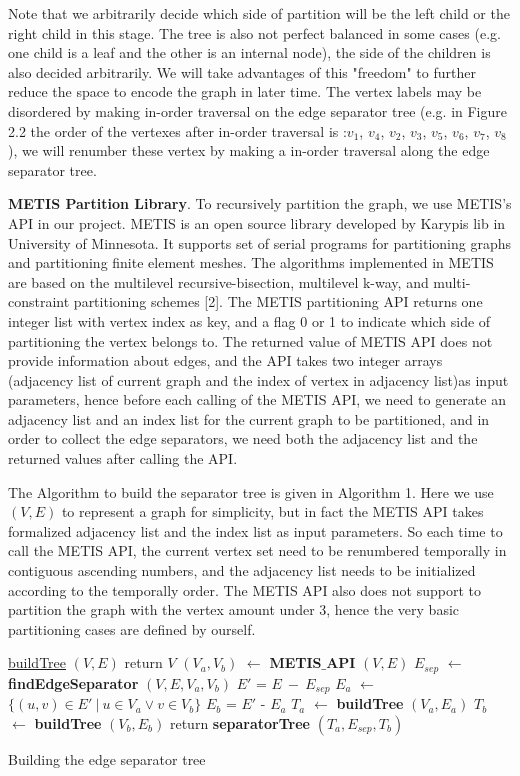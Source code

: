 \documentclass[12pt,glossary]{dalthesis}
\begin{document}
Note that we arbitrarily decide which side of partition will be the left child or the right child in this stage. The tree is also not perfect balanced in some cases (e.g. one child is a leaf and the other is an internal node), the side of the children is also decided arbitrarily. We will take advantages of this "freedom" to further reduce the space to encode the graph in later time. The vertex labels may be disordered by making in-order traversal on the edge separator tree (e.g. in Figure 2.2 the order of the vertexes after in-order traversal is :$v_{1}$, $v_{4}$, $v_{2}$, $v_{3}$, $v_{5}$, $v_{6}$, $v_{7}$, $v_{8}$), we will renumber these vertex by making a in-order traversal along the edge separator tree.


\textbf{METIS Partition Library}. To recursively partition the graph, we use METIS's API in our project. METIS is an open source library developed by Karypis lib in University of Minnesota. It supports set of serial programs for partitioning graphs and partitioning finite element meshes. The algorithms implemented in METIS are based on the multilevel recursive-bisection, multilevel k-way, and multi-constraint partitioning schemes [2]. The METIS partitioning API returns one integer list with vertex index as key, and a flag 0 or 1 to indicate which side of partitioning the vertex belongs to. The returned value of METIS API does not provide information about edges, and the API takes two integer arrays (adjacency list of current graph and the index of vertex in adjacency list)as input parameters, hence before each calling of the METIS API, we need to generate an adjacency list and an index list for the current graph to be partitioned, and in order to collect the edge separators, we need both the adjacency list and the returned values after calling the API.

The Algorithm to build the separator tree is given in Algorithm 1. Here we use $(V,E)$
to represent a graph for simplicity, but in fact the METIS API takes formalized adjacency list and the index list as input parameters. So each time to call the METIS API, the current vertex set need to be renumbered temporally in contiguous ascending numbers, and the adjacency list needs to be initialized according to the temporally order. The METIS API also does not support to partition the graph with the vertex amount under 3, hence the very basic partitioning cases are defined by ourself.

\begin{algorithm}
    \underline{buildTree} $(V,E)$\;
      {
        return $V$\;
      }
      {
      	$(V_{a},V_{b})$ $\leftarrow$ \textbf{METIS$\_$API} $(V,E)$  \;
		$E_{sep}$ $\leftarrow$ \textbf{findEdgeSeparator} $(V,E,V_{a},V_{b})$ \;
		$E'$ = $E \  - \ E_{sep}$   \;
      	$E_{a}$ $\leftarrow$ $\{ (u,v) \in E' \ | \  u\in V_{a} \vee v \in V_{b} \}$ \;
		$E_{b}$ = $E'$ - $E_{a}$ \;
		$T_{a}$ $\leftarrow$ \textbf{buildTree} $(V_{a},E_{a})$ \;
		$T_{b}$ $\leftarrow$ \textbf{buildTree} $(V_{b},E_{b})$ \;  
        return \textbf{separatorTree} $(T_{a}, E_{sep}, T_{b})$ \; 
      }
    \caption{Building the edge separator tree}
\end{algorithm}
\bigskip
\end{document}
